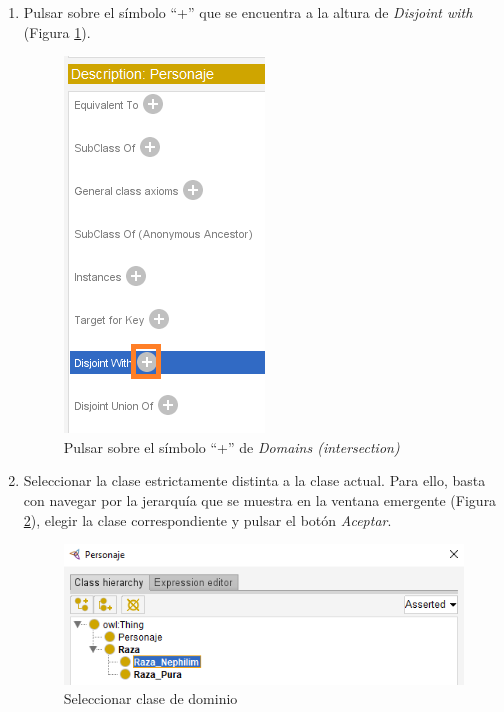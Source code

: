\begin{enumerate}
    \item Pulsar sobre el símbolo “+” que se encuentra a la altura de \textit{Disjoint with} (Figura \ref*{CreateClass_9}).
    \begin{figure}[ht]
        \centering
        \includegraphics[scale=0.6]{Figures/Protege/CreateClass_9.png}
        \caption{Pulsar sobre el símbolo “+” de \textit{Domains (intersection)}}
        \label{CreateClass_9}
    \end{figure}

    \item Seleccionar la clase estrictamente distinta a la clase actual. Para ello, basta con navegar por la 
    jerarquía que se muestra en la ventana emergente (Figura \ref*{CreateClass_10}), elegir la clase correspondiente 
    y pulsar el botón \textit{Aceptar}.

    \begin{figure}[ht]
        \centering
        \includegraphics[scale=0.6]{Figures/Protege/CreateClass_10.png}
        \caption{Seleccionar clase de dominio}
        \label{CreateClass_10}
    \end{figure}


\end{enumerate}
